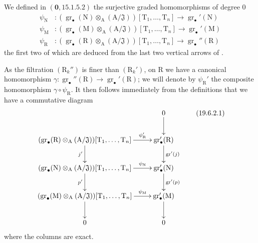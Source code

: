 \begin{env}[19.6.2]
\label{IV.19.6.2}
We defined in $(\mathbf{0},15.1.5.2)$ the surjective graded homomorphisms of degree $0$
\begin{align*}
  \psi_\mathrm{N} &: (\operatorname{gr}_\bullet(\mathrm{N})\otimes_\mathrm{A}(\mathrm{A}/\mathfrak{J}))[\mathrm{T}_1,\ldots,\mathrm{T}_n] \to \operatorname{gr}_\bullet'(\mathrm{N}) \\
  \psi_\mathrm{M} &: (\operatorname{gr}_\bullet(\mathrm{M})\otimes_\mathrm{A}(\mathrm{A}/\mathfrak{J}))[\mathrm{T}_1,\ldots,\mathrm{T}_n] \to \operatorname{gr}_\bullet'(\mathrm{M}) \\
  \psi_\mathrm{R} &: (\operatorname{gr}_\bullet(\mathrm{R})\otimes_\mathrm{A}(\mathrm{A}/\mathfrak{J}))[\mathrm{T}_1,\ldots,\mathrm{T}_n] \to \operatorname{gr}_\bullet''(\mathrm{R})
\end{align*}
the first two of which are deduced from the last two vertical arrows of .

As the filtration $(\mathrm{R}_k'')$ is finer than $(\mathrm{R}_k')$, on $\mathrm{R}$ we have a canonical homomorphism $\gamma:\operatorname{gr}_\bullet''(\mathrm{R})\to\operatorname{gr}_\bullet'(\mathrm{R})$; we will denote by $\psi_\mathrm{R}'$ the composite homomorphism $\gamma\circ\psi_\mathrm{R}$. It then follows immediately from the definitions that we have a commutative diagram
\[
\xymatrix{
  & 0 \ar[d] \\
  (\operatorname{gr}_\bullet(\mathrm{R})\otimes_\mathrm{A}(\mathrm{A}/\mathfrak{J}))[\mathrm{T}_1,\ldots,\mathrm{T}_n] \ar[r]^-{\psi_\mathrm{R}'} \ar[d]_{j'} & \operatorname{gr}_\bullet'(\mathrm{R}) \ar[d]^{\operatorname{gr}'(j)} \\
  (\operatorname{gr}_\bullet(\mathrm{N})\otimes_\mathrm{A}(\mathrm{A}/\mathfrak{J}))[\mathrm{T}_1,\ldots,\mathrm{T}_n] \ar[r]^-{\psi_\mathrm{N}} \ar[d]_{p'} & \operatorname{gr}_\bullet'(\mathrm{N}) \ar[d]^{\operatorname{gr}'(p)} \\
  (\operatorname{gr}_\bullet(\mathrm{M})\otimes_\mathrm{A}(\mathrm{A}/\mathfrak{J}))[\mathrm{T}_1,\ldots,\mathrm{T}_n] \ar[r]^-{\psi_\mathrm{M}} \ar[d] & \operatorname{gr}_\bullet'(\mathrm{M}) \ar[d] \\
  0 & 0
}
\tag{19.6.2.1}
\label{IV.19.6.2.1}
\]
where the columns are exact.
\end{env}

